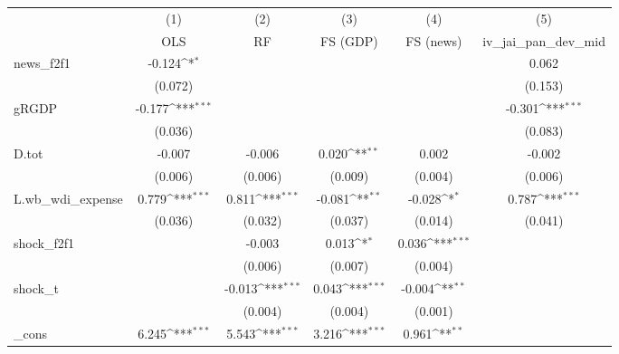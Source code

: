 {
\def\sym#1{\ifmmode^{#1}\else\(^{#1}\)\fi}
\begin{tabular}{l*{5}{c}}
\toprule
            &\multicolumn{1}{c}{(1)}&\multicolumn{1}{c}{(2)}&\multicolumn{1}{c}{(3)}&\multicolumn{1}{c}{(4)}&\multicolumn{1}{c}{(5)}\\
            &\multicolumn{1}{c}{OLS}&\multicolumn{1}{c}{RF}&\multicolumn{1}{c}{FS (GDP)}&\multicolumn{1}{c}{FS (news)}&\multicolumn{1}{c}{iv\_jai\_pan\_dev\_mid}\\
\midrule
news\_f2f1   &      -0.124\sym{*}  &                     &                     &                     &       0.062         \\
            &     (0.072)         &                     &                     &                     &     (0.153)         \\
\addlinespace
gRGDP       &      -0.177\sym{***}&                     &                     &                     &      -0.301\sym{***}\\
            &     (0.036)         &                     &                     &                     &     (0.083)         \\
\addlinespace
D.tot       &      -0.007         &      -0.006         &       0.020\sym{**} &       0.002         &      -0.002         \\
            &     (0.006)         &     (0.006)         &     (0.009)         &     (0.004)         &     (0.006)         \\
\addlinespace
L.wb\_wdi\_expense&       0.779\sym{***}&       0.811\sym{***}&      -0.081\sym{**} &      -0.028\sym{*}  &       0.787\sym{***}\\
            &     (0.036)         &     (0.032)         &     (0.037)         &     (0.014)         &     (0.041)         \\
\addlinespace
shock\_f2f1  &                     &      -0.003         &       0.013\sym{*}  &       0.036\sym{***}&                     \\
            &                     &     (0.006)         &     (0.007)         &     (0.004)         &                     \\
\addlinespace
shock\_t     &                     &      -0.013\sym{***}&       0.043\sym{***}&      -0.004\sym{**} &                     \\
            &                     &     (0.004)         &     (0.004)         &     (0.001)         &                     \\
\addlinespace
\_cons      &       6.245\sym{***}&       5.543\sym{***}&       3.216\sym{***}&       0.961\sym{**} &                     \\

\end{tabular}}
